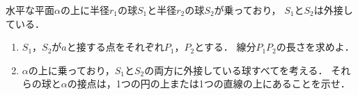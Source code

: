 \documentclass[../../main.tex]{subfiles}
\begin{document}
水平な平面$\alpha$の上に半径$r_1$の球$S_1$と半径$r_2$の球$S_2$が乗っており，
$S_1$と$S_2$は外接している．
\begin{enumerate}
  \item$S_1$，$S_2$が$a$と接する点をそれぞれ$P_1$，$P_2$とする．
    線分$P_1P_2$の長さを求めよ．
  \item$\alpha$の上に乗っており，$S_1$と$S_2$の両方に外接している球すべてを考える．
    それらの球と$\alpha$の接点は，1つの円の上または1つの直線の上にあることを示せ．
\end{enumerate}
\end{document}
